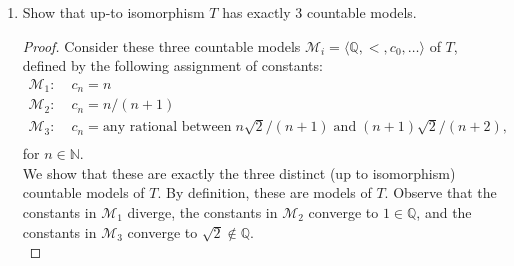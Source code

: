 \documentclass{article}
\begin{document}
\begin{enumerate}[label={\bf Q\arabic*:}]
\begin{enumerate}
\begin{proof}
          Now we prove that $T$ is complete. Assume by contradiction that
          it is not. Then there is a sentence $\varphi(c_1,\ldots,c_n)$ in
          language $\mathcal{L}$ and models $\mathcal{M}$ and $\mathcal{N}$
          of $T$ such that $\mathcal{M}\models\varphi(c_1,\ldots,c_n)$ but
          $\mathcal{N}\models\neg\varphi(c_1,\ldots,c_n)$. Note that the
          sentence $\varphi(c_1,\ldots,c_n)$ cannot be a sentence in the
          reduced language $\mathcal{L}'$ because $\mathcal{M}$ and
          $\mathcal{N}$ are also models of $T'$ and $T'$ is a complete
          theory. Now from the claim in the above paragraph,
          $\mathcal{M}\models\varphi(c_1,\ldots,c_n)$ implies
          $\mathcal{M}\models\phi$, where $\phi$ is defined as
          \begin{align*}
            \phi:= \forall x_1,\ldots,x_n\;\;
              x_1<\ldots<x_n\rightarrow\varphi(x_1,\ldots,x_n).
          \end{align*}
          Then $\phi$ is a sentence in the reduced language $\mathcal{L}'$,
          so by completeness of $T'$ and from the fact that $\mathcal{N}$
          is also a model of $T'$ in the reduced language, $\phi$ must also
          be true in $\mathcal{N}$. This would contradict
          $\mathcal{N}\models\neg\varphi(c_1,\ldots,c_n)$.
        \end{proof}

      \item Show that up-to isomorphism $T$ has exactly 3 countable models.
        \begin{proof}
          Consider these three countable models
          $\mathcal{M}_i=\langle\mathbb{Q},<,c_0,\ldots\rangle$ of $T$,
          defined by the following assignment of constants:
          \begin{align*}
            \mathcal{M}_1:\;  &c_n = n & \\
            \mathcal{M}_2:\;  &c_n = n/(n+1) & \\
            \mathcal{M}_3:\;  &c_n = \text{any rational between}\;
              n\sqrt{2}/(n+1)\; \text{and}\; (n+1)\sqrt{2}/(n+2), & \\
          \end{align*}
          for $n\in\mathbb{N}$. \\

          We show that these are exactly the three distinct (up to
          isomorphism) countable models of $T$. By definition, these are
          models of $T$. Observe that the constants in $\mathcal{M}_1$
          diverge, the constants in $\mathcal{M}_2$ converge to
          $1\in\mathbb{Q}$, and the constants in $\mathcal{M}_3$ converge
          to $\sqrt{2}\not\in\mathbb{Q}$. \\


\end{proof}
\end{enumerate}
\end{enumerate}
\end{document}
